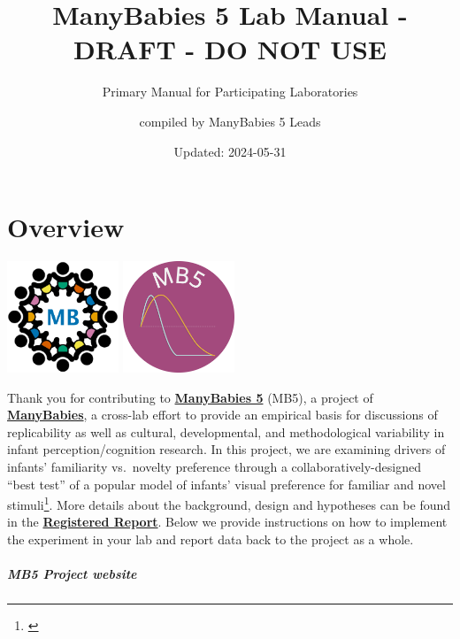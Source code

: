 \documentclass[
]{book}
\title{ManyBabies 5 Lab Manual - DRAFT - DO NOT USE}
\subtitle{Primary Manual for Participating Laboratories}
\author{compiled by ManyBabies 5 Leads}
\date{Updated: 2024-05-31}
\begin{document}
\maketitle

{
\setcounter{tocdepth}{1}
\tableofcontents
}
\chapter*{Overview}\label{overview}

\includegraphics[width=0.25\textwidth,height=\textheight]{images/mb-logo.png} \includegraphics[width=0.25\textwidth,height=\textheight]{images/mb5-logo.png}

Thank you for contributing to \href{https://manybabies.org/MB5/}{\textbf{ManyBabies 5}} (MB5), a project of \href{https://manybabies.org/}{\textbf{ManyBabies}}, a cross-lab effort to provide an empirical basis for discussions of replicability as well as cultural, developmental, and methodological variability in infant perception/cognition research. In this project, we are examining drivers of infants' familiarity vs.~novelty preference through a collaboratively-designed ``best test'' of a popular model of infants' visual preference for familiar and novel stimuli\footnote{\citet{hunterames}}. More details about the background, design and hypotheses can be found in the \href{https://osf.io/preprints/psyarxiv/ck3vd}{\textbf{Registered Report}}. Below we provide instructions on how to implement the experiment in your lab and report data back to the project as a whole.

\paragraph*{MB5 Project website}\label{mb5-project-website}
\end{document}
